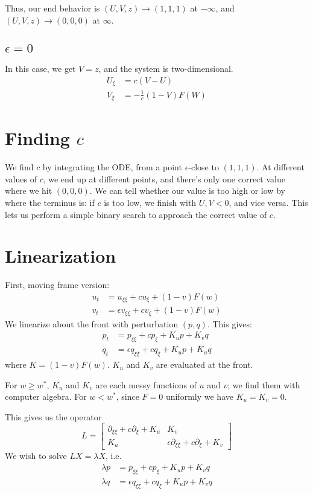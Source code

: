 \documentclass[10pt]{article}
\begin{document}
Thus, our end behavior is $(U,V,z) \to (1,1,1)$ at $-\infty$, and $(U,V,z) \to (0,0,0)$ at $\infty$.

\subsection{$\epsilon = 0$}
In this case, we get $V = z$, and the system is two-dimensional.
\begin{align}
U_\xi &= c(V-U) \label{front_eps0} \\
V_\xi &= - \frac{1}{c}(1-V)F(W)
\end{align}


\section{Finding $c$}
We find $c$ by integrating the ODE, from a point $\epsilon$-close to $(1,1,1)$.
At different values of $c$, we end up at different points, and there's only one correct value where we hit $(0,0,0)$.
We can tell whether our value is too high or low by where the terminus is: if $c$ is too low, we finish with $U,V < 0$, and vice versa.  This lets us perform a simple binary search to approach the correct value of $c$.


\section{Linearization}
First, moving frame version:
\begin{align}
u_t &= u_{\xi\xi} + c u_\xi + (1-v)F(w) \\
v_t &= \epsilon v_{\xi\xi} + c v_\xi+ (1-v)F(w)
\end{align}
We linearize about the front with perturbation $(p,q)$.  This gives:
\begin{align}
p_t &= p_{\xi\xi} + c p_\xi + K_u p + K_v q \\
q_t &= \epsilon q_{\xi\xi} + c q_\xi+ K_u p + K_u q
\end{align}
where $K = (1-v)F(w)$.
$K_u$ and $K_v$ are evaluated at the front.

For $w \geq w^*$, $K_u$ and $K_v$ are each messy functions of $u$ and $v$; we find them with computer algebra.
For $w < w^*$, since $F = 0$ uniformly we have $K_u = K_v = 0$.

This gives us the operator
\[
L = \begin{bmatrix}
\partial_{\xi\xi} + c \partial_\xi + K_u  &  K_v  \\
K_u  &  \epsilon \partial_{\xi\xi} + c \partial_\xi + K_v
\end{bmatrix}
\]
We wish to solve $LX = \lambda X$, i.e.
\begin{align}
\lambda p &= p_{\xi\xi} + c p_\xi + K_u p + K_v q \\
\lambda q &= \epsilon q_{\xi\xi} + c q_\xi+ K_u p + K_v q
\end{align}
\end{document}
